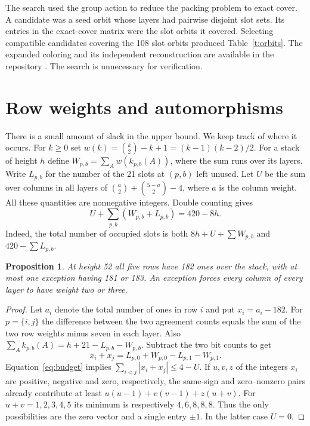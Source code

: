 \documentclass[11pt]{article}
\newtheorem{proposition}[theorem]{Proposition}
\begin{document}
The search used the group action to reduce the packing problem to exact cover. A candidate was a seed orbit whose layers had pairwise disjoint slot sets. Its entries in the exact-cover matrix were the slot orbits it covered. Selecting compatible candidates covering the 108 slot orbits produced Table~\ref{t:orbits}. The expanded coloring and its independent reconstruction are available in the repository \cite{data}. The search is unnecessary for verification.

\section{Row weights and automorphisms}
There is a small amount of slack in the upper bound. We keep track of where it occurs. For $k\ge0$ set $w(k)=\binom{k}{2}-k+1=(k-1)(k-2)/2$. For a stack of height $h$ define $W_{p,b}=\sum_A w(k_{p,b}(A))$, where the sum runs over its layers. Write $L_{p,b}$ for the number of the 21 slots at $(p,b)$ left unused. Let $U$ be the sum over columns in all layers of $\binom a2+\binom{5-a}2-4$, where $a$ is the column weight. All these quantities are nonnegative integers. Double counting gives
\begin{equation}\label{eq:budget}
 U+\sum_{p,b}(W_{p,b}+L_{p,b})=420-8h.
\end{equation}
Indeed, the total number of occupied slots is both $8h+U+\sum W_{p,b}$ and $420-\sum L_{p,b}$.

\begin{proposition}\label{p:balance}
At height 52 all five rows have 182 ones over the stack, with at most one exception having 181 or 183. An exception forces every column of every layer to have weight two or three.
\end{proposition}
\begin{proof}
Let $a_i$ denote the total number of ones in row $i$ and put $x_i=a_i-182$. For $p=\{i,j\}$ the difference between the two agreement counts equals the sum of the two row weights minus seven in each layer. Also $\sum_A k_{p,b}(A)=h+21-L_{p,b}-W_{p,b}$. Subtract the two bit counts to get
\[
 x_i+x_j=L_{p,0}+W_{p,0}-L_{p,1}-W_{p,1}.
\]
Equation~\eqref{eq:budget} implies $\sum_{i<j}|x_i+x_j|\le4-U$. If $u,v,z$ of the integers $x_i$ are positive, negative and zero, respectively, the same-sign and zero--nonzero pairs already contribute at least $u(u-1)+v(v-1)+z(u+v)$. For $u+v=1,2,3,4,5$ its minimum is respectively $4,6,8,8,8$. Thus the only possibilities are the zero vector and a single entry $\pm1$. In the latter case $U=0$.
\end{proof}
\end{document}
